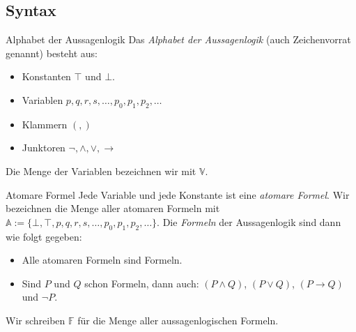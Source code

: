 \subsection{Syntax}


\begin{definition}{Alphabet der Aussagenlogik}
Das \textit{Alphabet der Aussagenlogik} (auch Zeichenvorrat genannt) besteht aus:
\begin{itemize}
\item Konstanten $\top$ und $\bot$.
\item Variablen $p,q,r,s,\dots,p_0,p_1,p_2,\dots$
\item Klammern $(,)$
\item Junktoren $\neg,\land,\lor,\to$
\end{itemize}
Die Menge der Variablen bezeichnen wir mit $\mathbb{V}$.
\end{definition}

\begin{comment}
Nachdem wir nun die Zeichen festgelegt haben, aus welchen die ``Wörter der
Aussagenlogik'' zusammengesetzt sind, werden
wir in der nächsten Definition, die für uns interessanten Wörter festlegen. Wir
definieren, also im Sinn vom einführenden Beispiel, die
``zulässigen Wörter'' (genannt Formeln) der Aussagenlogik.
\end{comment}

\begin{definition}{Atomare Formel}
Jede Variable und jede Konstante ist eine \textit{atomare Formel}. Wir bezeichnen die
Menge aller atomaren Formeln mit $\mathbb{A}:=\{\bot,\top,p,q,r,s,\dots,p_0,p_1,p_2,\dots
\}$.
Die \textit{Formeln} der Aussagenlogik sind dann wie folgt gegeben:
\begin{itemize}
\item Alle atomaren Formeln sind Formeln.
\item Sind $P$ und $Q$ schon Formeln, dann auch: $(P\land Q)$, $(P\lor Q)$, $(P\to Q)$ und $\neg P$.
\end{itemize}
Wir schreiben $\mathbb{F}$ für die Menge aller aussagenlogischen Formeln.
\end{definition}

\begin{comment}
\begin{remark} Ist eine Formel von einem Klammernpaar umgeben, dann lassen wir die äussersten
    Klammern
zugunsten einer besseren Lesbarkeit weg; wir schreiben beispielsweise $(p_0\lor p_1)\land
p_3$ anstelle von $((p_0\lor p_1)\land p_3)$. Des Weiteren setzen wir folgende Operatorrangfolge fest: Die Negation bindet stärker als die Konjunktion und die Disjunktion, die wiederum stärker binden als die Implikation.
\end{remark}
\end{comment}

